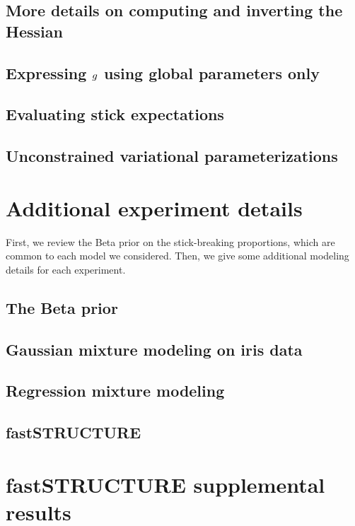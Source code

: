 \documentclass[ba]{imsart}
\begin{document}
\subsection{More details on computing and inverting the Hessian}


\subsection{Expressing $g$ using global parameters only}


\subsection{Evaluating stick expectations}


\subsection{Unconstrained variational parameterizations}


\section{Additional experiment details}

First, we review the Beta prior on the stick-breaking proportions,
which are common to each model we considered.
Then, we give some additional modeling details for each experiment.

    \subsection{The Beta prior}
    

    \subsection{Gaussian mixture modeling on iris data}
    

    \subsection{Regression mixture modeling}
    

    \subsection{fastSTRUCTURE}
    


\section{fastSTRUCTURE supplemental results}

\end{document}
